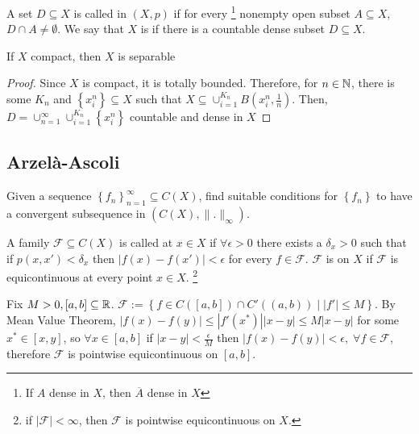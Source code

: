 \begin{defn}
    A set $D \subseteq X$ is called  in $(X, p)$ if for every
    \footnote{If $A$ dense in $X$, then $\overline{A}$ dense in $X$}  
    nonempty open subset $A \subseteq X$, $D \cap A \neq \emptyset$. We say that $X$ is 
     if there is a countable dense subset $D \subseteq X$.    
\end{defn}

\begin{prop}
    If $X$ compact, then $X$ is separable
\end{prop}
\begin{proof}
    Since $X$ is compact, it is totally bounded. Therefore, for $n \in \mathbb{N}$, there is some
    $K_n$ and $\left\{ x_i^n \right\} \subseteq X$ such that 
    $X \subseteq \cup_{i = 1}^{K_n} B(x_i^n, \frac{1}{n})$. Then, 
    $D = \cup_{n = 1}^{\infty}\cup_{i = 1}^{K_n} \left\{ x_i^n \right\} $ countable and 
    dense in $X$ 
\end{proof}

\subsection{Arzelà-Ascoli}
\begin{goal}
    Given a sequence $\left\{ f_n \right\}_{n = 1}^{\infty} \subseteq C(X)$, find suitable conditions
    for $\left\{ f_n \right\}$ to have a convergent subsequence in 
    $(C(X), \| . \|_{\infty}) $.
\end{goal}

\begin{defn}[Equicontinuous]
    A family $\mathcal{F} \subseteq C(X)$ is called  at
    $x \in X$ if $\forall \epsilon > 0$ there exists a $\delta_x > 0$ such that 
    if $p(x, x') < \delta_x$ then $\left| f(x) - f(x') \right| < \epsilon $ for every $f \in \mathcal{F}$.
    $\mathcal{F}$ is  on $X$ if $\mathcal{F}$ is equicontinuous at
    every point $x \in X$. \footnote{
        if $\left| \mathcal{F} \right|  < \infty$, then $\mathcal{F}$ is pointwise equicontinuous on $X$.   
    }      
\end{defn}

\begin{exmp}
    Fix $M > 0, [a,b] \subseteq \mathbb{R}$. $\mathcal{F} := \left\{ f \in C([a,b]) \cap C'((a,b))
    \mid \left| f' \right| \leq M \right\} $. By Mean Value Theorem, $\left| f(x) - f(y) \right|
    \leq \left| f'(x^*) \right| \left| x - y \right| \leq M \left| x -y \right|  $ for some 
    $x^* \in [x, y]$, so $\forall x \in [a,b]$ 
    if $\left| x - y \right| < \frac{\epsilon}{M} $ then $\left| f(x) - f(y) \right| < \epsilon, 
    \; \forall f \in \mathcal{F}$, therefore $\mathcal{F}$ is pointwise equicontinuous on $[a,b]$.     
\end{exmp}

